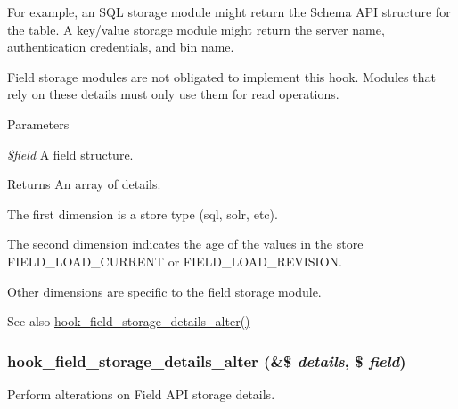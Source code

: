 For example, an SQL storage module might return the Schema API structure for the table. A key/value storage module might return the server name, authentication credentials, and bin name.

Field storage modules are not obligated to implement this hook. Modules that rely on these details must only use them for read operations.


\begin{DoxyParams}{Parameters}
\item[{\em \$field}]A field structure.\end{DoxyParams}
\begin{DoxyReturn}{Returns}
An array of details.
\begin{DoxyItemize}
\item The first dimension is a store type (sql, solr, etc).
\item The second dimension indicates the age of the values in the store FIELD\_\-LOAD\_\-CURRENT or FIELD\_\-LOAD\_\-REVISION.
\item Other dimensions are specific to the field storage module.
\end{DoxyItemize}
\end{DoxyReturn}
\begin{DoxySeeAlso}{See also}
\hyperlink{group__field__storage_gae79d6c32c896d3db208c90f3ab1b1ad0}{hook\_\-field\_\-storage\_\-details\_\-alter()} 
\end{DoxySeeAlso}
\hypertarget{group__field__storage_gae79d6c32c896d3db208c90f3ab1b1ad0}{
\subsubsection[{hook\_\-field\_\-storage\_\-details\_\-alter}]{\setlength{\rightskip}{0pt plus 5cm}hook\_\-field\_\-storage\_\-details\_\-alter (\&\$ {\em details}, \/  \$ {\em field})}}
\label{group__field__storage_gae79d6c32c896d3db208c90f3ab1b1ad0}
Perform alterations on Field API storage details.


